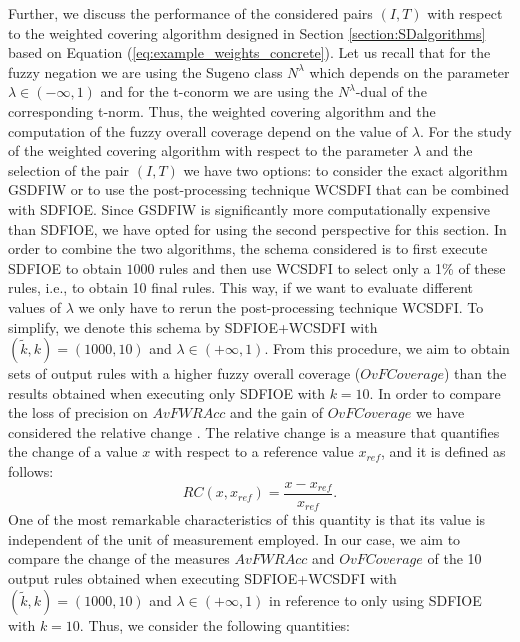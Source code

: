 Further, we discuss the performance of the considered pairs $(I,T)$ with respect to the weighted covering algorithm designed in Section \ref{section:SDalgorithms} based on Equation (\ref{eq:example_weights_concrete}).  Let us recall that for the fuzzy negation we are using the Sugeno class $N^{\lambda}$ which depends on the parameter $\lambda \in (-\infty,1)$ and for the t-conorm we are using the $N^{\lambda}$-dual of the corresponding t-norm. Thus, the weighted covering algorithm and the computation of the fuzzy overall coverage depend on the value of $\lambda$. For the study of the weighted covering algorithm with respect to the parameter $\lambda$ and the selection of the pair $(I,T)$ we have two options: to consider the exact algorithm GSDFIW or to use the post-processing technique WCSDFI that can be combined with SDFIOE. Since GSDFIW is significantly more computationally expensive than SDFIOE, we have opted for using the second perspective for this section. In order to combine the two algorithms, the schema considered is to first execute SDFIOE to obtain $1000$ rules and then use WCSDFI to select only a 1\% of these rules, i.e., to obtain 10 final rules. This way, if we want to evaluate different values of $\lambda$ we only have to rerun the post-processing technique WCSDFI. To simplify, we denote this schema by SDFIOE+WCSDFI with $(\tilde{k},k)=(1000,10)$ and $\lambda \in (+\infty,1)$. From this procedure, we aim to obtain sets of output rules with a higher fuzzy overall coverage ($OvFCoverage$) than the results obtained when executing only  SDFIOE with $k=10$. In order to compare the loss of precision on $AvFWRAcc$ and the gain of $OvFCoverage$ we have considered the relative change \cite{Tornqvist1985}. The relative change is a measure that quantifies the change of a value $x$ with respect to a reference value $x_{ref}$, and it is defined as follows:
$$RC(x,x_{ref}) = \frac{x-x_{ref}}{x_{ref}}.$$
One of the most remarkable characteristics of this quantity is that its value is independent of the unit of measurement employed. In our case, we aim to compare the change of the measures $AvFWRAcc$ and $OvFCoverage$ of the 10 output rules obtained when executing SDFIOE+WCSDFI with $(\tilde{k},k)=(1000,10)$ and $\lambda \in (+\infty,1)$ in reference to only using SDFIOE with $k=10$.  Thus, we consider the following quantities:
